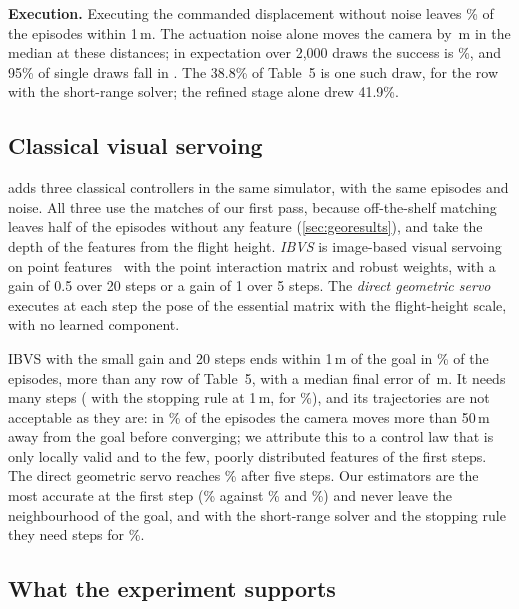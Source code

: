 \noindent\textbf{Execution.} Executing the commanded displacement without noise leaves \ogNoNoise\% of the episodes within 1\,m. The actuation noise alone moves the camera by \ogNoiseDisp\,m in the median at these distances; in expectation over 2{,}000 draws the success is \ogNoise\%, and 95\% of single draws fall in \ci{\ogNoiseLo}{\ogNoiseHi}. The 38.8\% of Table~5 is one such draw, for the row with the short-range solver; the refined stage alone drew 41.9\%.



\subsection{Classical visual servoing}
\label{sec:servo}

 adds three classical controllers in the same simulator, with the same episodes and noise. All three use the matches of our first pass, because off-the-shelf matching leaves half of the episodes without any feature (\cref{sec:georesults}), and take the depth of the features from the flight height. \emph{IBVS} is image-based visual servoing on point features~\cite{chaumette2006visual} with the point interaction matrix and robust weights, with a gain of 0.5 over 20 steps or a gain of 1 over 5 steps. The \emph{direct geometric servo} executes at each step the pose of the essential matrix with the flight-height scale, with no learned component.

IBVS with the small gain and 20 steps ends within 1\,m of the goal in \svIbvsFinal\% of the episodes, more than any row of Table~5, with a median final error of \svIbvsMed\,m. It needs many steps (\svIbvsStopSteps{} with the stopping rule at 1\,m, for \svIbvsStopSR\%), and its trajectories are not acceptable as they are: in \svIbvsExc\% of the episodes the camera moves more than 50\,m away from the goal before converging; we attribute this to a control law that is only locally valid and to the few, poorly distributed features of the first steps. The direct geometric servo reaches \svGeoFinal\% after five steps. Our estimators are the most accurate at the first step (\svSiiAfterOne\% against \svGeoAfterOne\% and \svIbvsAfterOne\%) and never leave the neighbourhood of the goal, and with the short-range solver and the stopping rule they need \svSiipStopSteps{} steps for \svSiipStopSR\%.

\subsection{What the experiment supports}
\label{sec:clscope}

